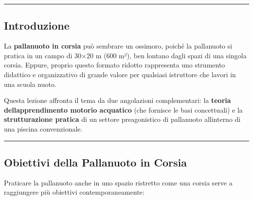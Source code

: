 \documentclass[a4paper,11pt]{article}
\begin{document}
\begin{center}\rule{0.5\linewidth}{0.5pt}\end{center}

\subsection{Introduzione}\label{introduzione-13}

La \textbf{pallanuoto in corsia} può sembrare un ossimoro, poiché la
pallanuoto si pratica in un campo di 30×20 m (600 m²), ben lontano dagli
spazi di una singola corsia. Eppure, proprio questo formato ridotto
rappresenta uno strumento didattico e organizzativo di grande valore per
qualsiasi istruttore che lavori in una scuola nuoto.

Questa lezione affronta il tema da due angolazioni complementari: la
\textbf{teoria dell\textquotesingle apprendimento motorio acquatico}
(che fornisce le basi concettuali) e la \textbf{strutturazione pratica}
di un settore preagonistico di pallanuoto all\textquotesingle interno di
una piscina convenzionale.

\begin{center}\rule{0.5\linewidth}{0.5pt}\end{center}

\subsection{Obiettivi della Pallanuoto in
      Corsia}\label{obiettivi-della-pallanuoto-in-corsia}

Praticare la pallanuoto anche in uno spazio ristretto come una corsia
serve a raggiungere più obiettivi contemporaneamente:
\end{document}
